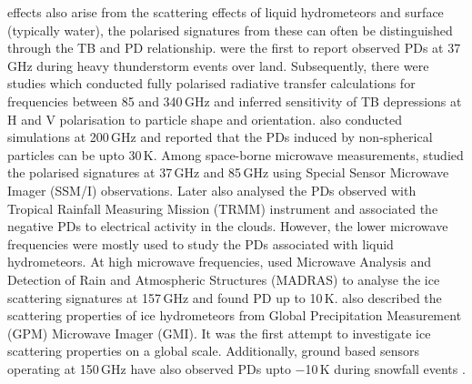 \documentclass[amt, manuscript]{copernicus}
\begin{document}
effects also arise from the scattering effects of liquid hydrometeors \citep{ekelund2020using} and surface (typically water), the polarised signatures from these can often be distinguished through the TB and PD relationship. \citet{spencer:heavy:83} were the first to report observed PDs at 37\,GHz during heavy thunderstorm events over land. Subsequently, there were studies \citep{evans:micro1:95, evans:micro:95} which conducted fully polarised radiative transfer calculations for frequencies between 85 and 340\,GHz and inferred sensitivity of TB depressions at H and V polarisation to particle shape and orientation. \citet{czekala:effect:98} also conducted simulations at 200\,GHz and reported that the PDs induced by non-spherical particles can be upto 30\,K. Among space-borne microwave measurements, \citet{prigent:micro:01} studied the polarised signatures at 37\,GHz and 85\,GHz using Special Sensor Microwave Imager (SSM/I) observations. Later \citet{prigent:relat:05} also analysed the PDs observed with Tropical Rainfall Measuring Mission (TRMM) instrument and associated the negative PDs to electrical activity in the clouds. However, the lower microwave frequencies were mostly used to study the PDs associated with liquid hydrometeors. At high microwave frequencies, \citet{defer:first:14} used Microwave Analysis and Detection of Rain and Atmospheric Structures (MADRAS) to analyse the ice scattering signatures at 157\,GHz and found PD up to 10\,K. \citet{gong:micro:17} also described the scattering properties of ice hydrometeors from  Global Precipitation Measurement (GPM) Microwave Imager (GMI). It was the first attempt to investigate ice scattering properties on a global scale. Additionally, ground based sensors operating at 150\,GHz have also observed PDs upto $-$10\,K during snowfall events \citep{xie:snow:12}. 
\end{document}
